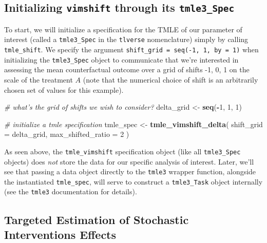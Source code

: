 \documentclass[12pt, krantz2,]{book}
\newenvironment{Shaded}{\begin{snugshade}}{\end{snugshade}}
\newcommand{\CommentTok}[1]{\textcolor[rgb]{0.56,0.35,0.01}{\textit{#1}}}
\newcommand{\DataTypeTok}[1]{\textcolor[rgb]{0.13,0.29,0.53}{#1}}
\newcommand{\DecValTok}[1]{\textcolor[rgb]{0.00,0.00,0.81}{#1}}
\newcommand{\KeywordTok}[1]{\textcolor[rgb]{0.13,0.29,0.53}{\textbf{#1}}}
\newcommand{\NormalTok}[1]{#1}
\newcommand{\OperatorTok}[1]{\textcolor[rgb]{0.81,0.36,0.00}{\textbf{#1}}}
\newcommand{\StringTok}[1]{\textcolor[rgb]{0.31,0.60,0.02}{#1}}
\theoremstyle{definition}
\theoremstyle{definition}
\theoremstyle{definition}
\newcommand{\1}{\mathbbm{1}}
\begin{document}
\hypertarget{initializing-vimshift-through-its-tmle3_spec}{%
\subsection{\texorpdfstring{Initializing \texttt{vimshift} through its \texttt{tmle3\_Spec}}{Initializing vimshift through its tmle3\_Spec}}\label{initializing-vimshift-through-its-tmle3_spec}}

To start, we will initialize a specification for the TMLE of our parameter of
interest (called a \texttt{tmle3\_Spec} in the \texttt{tlverse} nomenclature) simply by calling
\texttt{tmle\_shift}. We specify the argument \texttt{shift\_grid\ =\ seq(-1,\ 1,\ by\ =\ 1)}
when initializing the \texttt{tmle3\_Spec} object to communicate that we're interested
in assessing the mean counterfactual outcome over a grid of shifts -1, 0, 1 on the scale of the treatment \(A\) (note that the numerical
choice of shift is an arbitrarily chosen set of values for this example).

\begin{Shaded}
\begin{Highlighting}[]
\CommentTok{# what's the grid of shifts we wish to consider?}
\NormalTok{delta_grid <-}\StringTok{ }\KeywordTok{seq}\NormalTok{(}\OperatorTok{-}\DecValTok{1}\NormalTok{, }\DecValTok{1}\NormalTok{, }\DecValTok{1}\NormalTok{)}

\CommentTok{# initialize a tmle specification}
\NormalTok{tmle_spec <-}\StringTok{ }\KeywordTok{tmle_vimshift_delta}\NormalTok{(}
  \DataTypeTok{shift_grid =}\NormalTok{ delta_grid,}
  \DataTypeTok{max_shifted_ratio =} \DecValTok{2}
\NormalTok{)}
\end{Highlighting}
\end{Shaded}

As seen above, the \texttt{tmle\_vimshift} specification object (like all \texttt{tmle3\_Spec}
objects) does \emph{not} store the data for our specific analysis of interest. Later,
we'll see that passing a data object directly to the \texttt{tmle3} wrapper function,
alongside the instantiated \texttt{tmle\_spec}, will serve to construct a \texttt{tmle3\_Task}
object internally (see the \texttt{tmle3} documentation for details).

\hypertarget{targeted-estimation-of-stochastic-interventions-effects-1}{%
\subsection{Targeted Estimation of Stochastic Interventions Effects}\label{targeted-estimation-of-stochastic-interventions-effects-1}}
\end{document}
